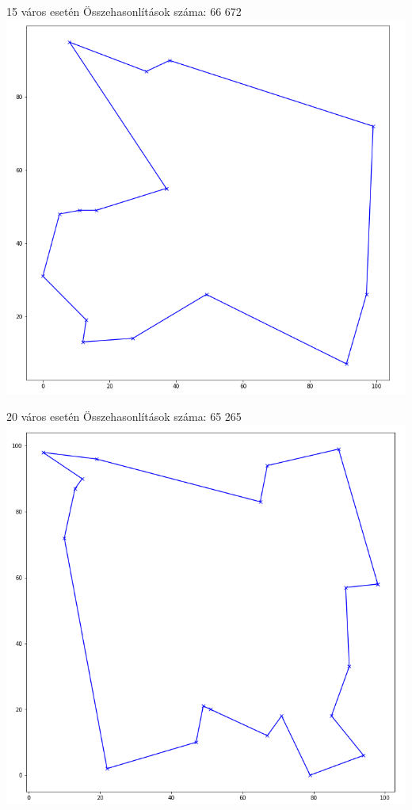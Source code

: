 15 város esetén
Összehasonlítások száma: 66 672
\includegraphics[scale=0.4]{images/15.png}

20 város esetén
Összehasonlítások száma: 65 265
\includegraphics[scale=0.4]{images/20.png}

